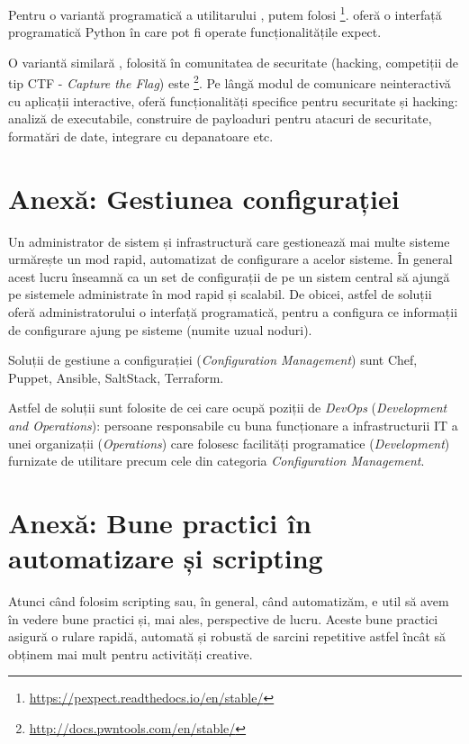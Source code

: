 Pentru o variantă programatică a utilitarului , putem folosi \footnote{\url{https://pexpect.readthedocs.io/en/stable/}}.
 oferă o interfață programatică Python în care pot fi operate funcționalitățile expect.

O variantă similară , folosită în comunitatea de securitate (hacking, competiții de tip CTF - \textit{Capture the Flag}) este \footnote{\url{http://docs.pwntools.com/en/stable/}}.
Pe lângă modul de comunicare neinteractivă cu aplicații interactive,  oferă funcționalități specifice pentru securitate și hacking: analiză de executabile, construire de payloaduri pentru atacuri de securitate, formatări de date, integrare cu depanatoare etc.

\section{Anexă: Gestiunea configurației}
\label{sec:auto:config-management}

Un administrator de sistem și infrastructură care gestionează mai multe sisteme urmărește un mod rapid, automatizat de configurare a acelor sisteme.
În general acest lucru înseamnă ca un set de configurații de pe un sistem central să ajungă pe sistemele administrate în mod rapid și scalabil.
De obicei, astfel de soluții oferă administratorului o interfață programatică, pentru a configura ce informații de configurare ajung pe sisteme (numite uzual noduri).

Soluții de gestiune a configurației (\textit{Configuration Management}) sunt Chef, Puppet, Ansible, SaltStack, Terraform.

Astfel de soluții sunt folosite de cei care ocupă poziții de \textit{DevOps} (\textit{Development and Operations}): persoane responsabile cu buna funcționare a infrastructurii IT a unei organizații (\textit{Operations}) care folosesc facilități programatice (\textit{Development}) furnizate de utilitare precum cele din categoria \textit{Configuration Management}.

\section{Anexă: Bune practici în automatizare și scripting}
\label{sec:auto:good-practice}

Atunci când folosim scripting sau, în general, când automatizăm, e util să avem în vedere bune practici și, mai ales, perspective de lucru.
Aceste bune practici asigură o rulare rapidă, automată și robustă de sarcini repetitive astfel încât să obținem mai mult pentru activități creative.

